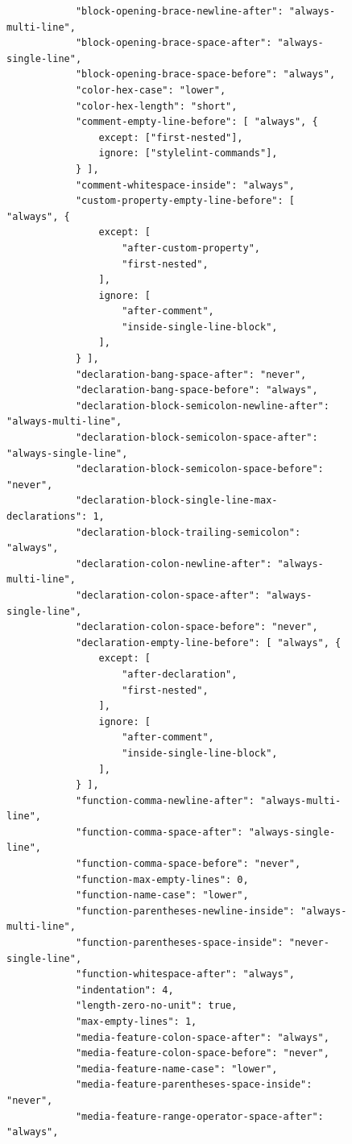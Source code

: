 \begin{figure}[h!]
\begin{small}
\begin{verbatim}
            "block-opening-brace-newline-after": "always-multi-line",
            "block-opening-brace-space-after": "always-single-line",
            "block-opening-brace-space-before": "always",
            "color-hex-case": "lower",
            "color-hex-length": "short",
            "comment-empty-line-before": [ "always", {
                except: ["first-nested"],
                ignore: ["stylelint-commands"],
            } ],
            "comment-whitespace-inside": "always",
            "custom-property-empty-line-before": [ "always", {
                except: [
                    "after-custom-property",
                    "first-nested",
                ],
                ignore: [
                    "after-comment",
                    "inside-single-line-block",
                ],
            } ],
            "declaration-bang-space-after": "never",
            "declaration-bang-space-before": "always",
            "declaration-block-semicolon-newline-after": "always-multi-line",
            "declaration-block-semicolon-space-after": "always-single-line",
            "declaration-block-semicolon-space-before": "never",
            "declaration-block-single-line-max-declarations": 1,
            "declaration-block-trailing-semicolon": "always",
            "declaration-colon-newline-after": "always-multi-line",
            "declaration-colon-space-after": "always-single-line",
            "declaration-colon-space-before": "never",
            "declaration-empty-line-before": [ "always", {
                except: [
                    "after-declaration",
                    "first-nested",
                ],
                ignore: [
                    "after-comment",
                    "inside-single-line-block",
                ],
            } ],
            "function-comma-newline-after": "always-multi-line",
            "function-comma-space-after": "always-single-line",
            "function-comma-space-before": "never",
            "function-max-empty-lines": 0,
            "function-name-case": "lower",
            "function-parentheses-newline-inside": "always-multi-line",
            "function-parentheses-space-inside": "never-single-line",
            "function-whitespace-after": "always",
            "indentation": 4,
            "length-zero-no-unit": true,
            "max-empty-lines": 1,
            "media-feature-colon-space-after": "always",
            "media-feature-colon-space-before": "never",
            "media-feature-name-case": "lower",
            "media-feature-parentheses-space-inside": "never",
            "media-feature-range-operator-space-after": "always",

\end{verbatim}
\end{small}
\end{figure}

